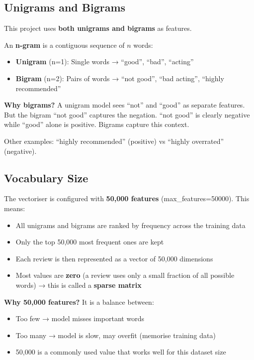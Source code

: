 \documentclass[12pt, a4paper]{article}
\begin{document}
\subsection{Unigrams and Bigrams}

This project uses \textbf{both unigrams and bigrams} as features.

\begin{conceptbox}[N-grams]
An \textbf{n-gram} is a contiguous sequence of $n$ words:
\begin{itemize}
  \item \textbf{Unigram} (n=1): Single words → ``good'', ``bad'', ``acting''
  \item \textbf{Bigram} (n=2): Pairs of words → ``not good'', ``bad acting'', ``highly recommended''
\end{itemize}

\textbf{Why bigrams?} A unigram model sees ``not'' and ``good'' as separate features. But the bigram ``not good'' captures the negation. ``not good'' is clearly negative while ``good'' alone is positive. Bigrams capture this context.

\medskip
Other examples: ``highly recommended'' (positive) vs ``highly overrated'' (negative).
\end{conceptbox}

\subsection{Vocabulary Size}

The vectoriser is configured with \textbf{50{,}000 features} (max\_features=50000). This means:

\begin{itemize}
  \item All unigrams and bigrams are ranked by frequency across the training data
  \item Only the top 50{,}000 most frequent ones are kept
  \item Each review is then represented as a vector of 50{,}000 dimensions
  \item Most values are \textbf{zero} (a review uses only a small fraction of all possible words) → this is called a \textbf{sparse matrix}
\end{itemize}

\begin{whybox}
\textbf{Why 50{,}000 features?} It is a balance between:
\begin{itemize}
  \item Too few → model misses important words
  \item Too many → model is slow, may overfit (memorise training data)
  \item 50{,}000 is a commonly used value that works well for this dataset size
\end{itemize}
\end{whybox}
\end{document}
